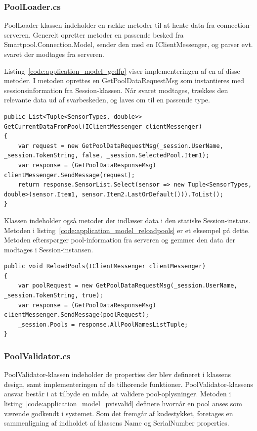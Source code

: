 \subsubsection{PoolLoader.cs}
PoolLoader-klassen indeholder en række metoder til at hente data fra connection-serveren. Generelt opretter metoder en passende besked fra Smartpool.Connection.Model, sender den med en IClientMessenger, og parser evt. svaret der modtages fra serveren.

Listing~\ref{code:application_model_gcdfp} viser implementeringen af en af disse metoder. I metoden oprettes en GetPoolDataRequestMsg som instantieres med sessionsinformation fra Session-klassen. Når svaret modtages, trækkes den relevante data ud af svarbeskeden, og laves om til en passende type.

\begin{lstlisting}[caption={GetCurrentDataFromPool(...)},label={code:application_model_gcdfp}]
public List<Tuple<SensorTypes, double>> GetCurrentDataFromPool(IClientMessenger clientMessenger)
{
	var request = new GetPoolDataRequestMsg(_session.UserName, _session.TokenString, false, _session.SelectedPool.Item1);
	var response = (GetPoolDataResponseMsg) clientMessenger.SendMessage(request);
	return response.SensorList.Select(sensor => new Tuple<SensorTypes, double>(sensor.Item1, sensor.Item2.LastOrDefault())).ToList();
}
\end{lstlisting}

Klassen indeholder også metoder der indlæser data i den statiske Session-instans. Metoden i listing~\ref{code:application_model_reloadpools} er et eksempel på dette. Metoden efterspørger pool-information fra serveren og gemmer den data der modtages i Session-instansen.

\begin{lstlisting}[caption={ReloadPools(...)},label={code:application_model_reloadpools}]
public void ReloadPools(IClientMessenger clientMessenger)
{
	var poolRequest = new GetPoolDataRequestMsg(_session.UserName, _session.TokenString, true);
	var response = (GetPoolDataResponseMsg) clientMessenger.SendMessage(poolRequest);
	_session.Pools = response.AllPoolNamesListTuple;
}
\end{lstlisting}

\subsubsection{PoolValidator.cs}
PoolValidator-klassen indeholder de properties der blev defineret i klassens design, samt implementeringen af de tilhørende funktioner. PoolValidator-klassens ansvar består i at tilbyde en måde, at validere pool-oplysninger. Metoden i listing~\ref{code:application_model_pvisvalid} definere hvornår en pool anses som værende godkendt i systemet. Som det fremgår af kodestykket, foretages en sammenligning af indholdet af klassens Name og SerialNumber properties.

